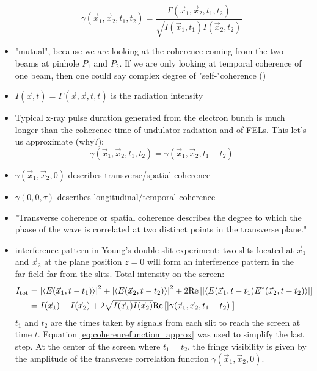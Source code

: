 \documentclass{article}
\newcommand{\mathup}[1]{\text{\textup{#1}}}
\begin{document}
\begin{itemize}
\begin{equation}
	\gamma(\vec{x}_1,\vec{x}_2,t_1,t_2) = \frac{\Gamma(\vec{x}_1,\vec{x}_2,t_1,t_2)}{\sqrt{ I(\vec{x}_1,t_1)  I(\vec{x}_2,t_2)}} 
	\end{equation}
	\item "mutual", because we are looking at the coherence coming from the two beams at pinhole $ P_1 $ and $ P_2 $. If we are only looking at temporal coherence of one beam, then one could say complex degree of "self-"coherence (\cite[eq. (5.2-12)]{Goodman2015-StatisticalOptics2e})
	\item $ I(\vec{x},t) = \Gamma(\vec{x},\vec{x},t,t) $ is the radiation intensity
	\item Typical x-ray pulse duration generated from the electron bunch is much longer than the coherence time of undulator radiation and of FELs. This let's us approximate (why?):
	\begin{equation}\label{eq:coherencefunction_approx}
	\gamma(\vec{x}_1,\vec{x}_2,t_1,t_2) = \gamma(\vec{x}_1,\vec{x}_2,t_1-t_2)
	\end{equation}
	\item $ \gamma(\vec{x}_1,\vec{x}_2,0) $ describes transverse/spatial coherence
	\item $ \gamma(0,0,\tau) $ describes longitudinal/temporal coherence
	\item "Transverse coherence or spatial coherence describes the degree to which the phase of the wave is correlated at two distinct points in the transverse plane."
	\item interference pattern in Young's double slit experiment: two slits located at $ \vec{x}_1 $ and $ \vec{x}_2 $ at the plane position $ z = 0 $ will form an interference pattern in the far-field far from the slits.
	Total intensity on the screen:
	\begin{align}
	I_\mathup{tot} &= 
	  \left| \left\langle E(\vec{x}_1, t-t_1)\right\rangle \right|^2 
	+ \left| \left\langle E(\vec{x}_2, t-t_2)\right\rangle \right|^2
	+ 2 \mathup{Re}\left[ \left| \left\langle E(\vec{x}_1, t-t_1) E^*(\vec{x}_2, t-t_2)\right\rangle \right| \right] \\
	&= I(\vec{x}_1) + I(\vec{x}_2) + 2 \sqrt{I(\vec{x}_1) I(\vec{x}_2)} \mathup{Re}\left[ \left| \gamma(\vec{x}_1, \vec{x}_2, t_1-t_2) \right| \right]
	\end{align}
	$ t_1 $ and $ t_2 $ are the times taken by signals from each slit to reach the screen at time $ t $.  Equation \ref{eq:coherencefunction_approx} was used to simplify the last step. At the center of the screen where $ t_1 = t_2 $, the fringe visibility is given by the amplitude of the transverse correlation function $ \gamma(\vec{x}_1, \vec{x}_2, 0) $.

\end{itemize}
\end{document}
